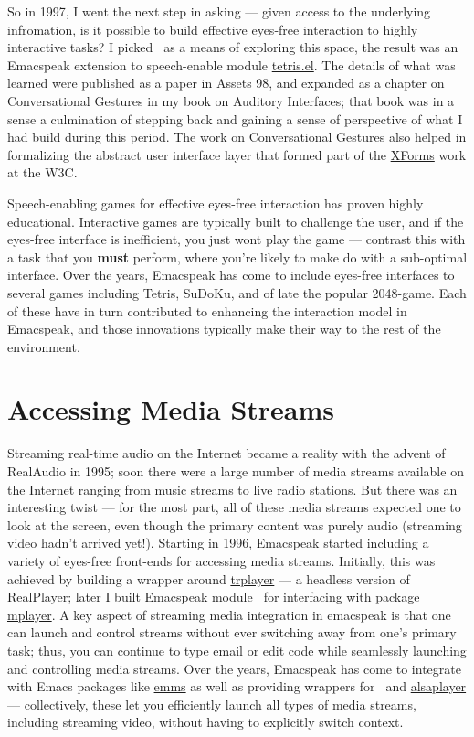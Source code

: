 \documentclass[11pt]{article}
\begin{document}
So in 1997, I went the next step in asking — given access to the
underlying infromation, is it possible to build effective
eyes-free interaction to highly interactive tasks? I picked
$_{\text{ }}$as a means of exploring this space, the result was an
Emacspeak extension to speech-enable module \uline{tetris.el}. The
details of what was learned were published as a paper in Assets
98, and expanded as a chapter on Conversational Gestures in my
book on Auditory Interfaces; that book was in a sense a
culmination of stepping back and gaining a sense of perspective
of what I had build during this period. The work on
Conversational Gestures also helped in formalizing the abstract
user interface layer that formed part of the
\href{http://www.w3.org/MarkUp/Forms/}{XForms} work at the W3C.

Speech-enabling games for effective eyes-free interaction has
proven highly educational. Interactive games are typically built
to challenge the user, and if the eyes-free interface is
inefficient, you just wont play the game — contrast this with a
task that you \textbf{must} perform, where you're likely to make do with
a sub-optimal interface. Over the years, Emacspeak has come to
include eyes-free interfaces to several games including Tetris,
SuDoKu, and of late the popular 2048-game. Each of these have in
turn contributed to enhancing the interaction model in Emacspeak,
and those innovations typically make their way to the rest of the
environment.


\section{Accessing Media Streams}
\label{sec-10}

Streaming real-time audio on the Internet became a reality with
the advent of RealAudio in 1995; soon there were a large number
of media streams available on the Internet ranging from music
streams to live radio stations. But there was an interesting
twist — for the most part, all of these media streams expected
one to look at the screen, even though the primary content was
purely audio (streaming video hadn't arrived yet!). Starting in
1996, Emacspeak started including a variety of eyes-free
front-ends for accessing media streams. Initially, this was
achieved by building a wrapper around \uline{trplayer} — a headless
version of RealPlayer; later I built Emacspeak module
$_{\text{ }}$for interfacing with package \uline{mplayer}. A
key aspect of streaming media integration in emacspeak is that
one can launch and control streams without ever switching away
from one's primary task; thus, you can continue to type email or
edit code while seamlessly launching and controlling media
streams. Over the years, Emacspeak has come to integrate with
Emacs packages like \uline{emms} as well as providing wrappers for
$_{\text{ }}$and \uline{alsaplayer} — collectively, these let you
efficiently launch all types of media streams, including
streaming video, without having to explicitly switch context.
\end{document}
